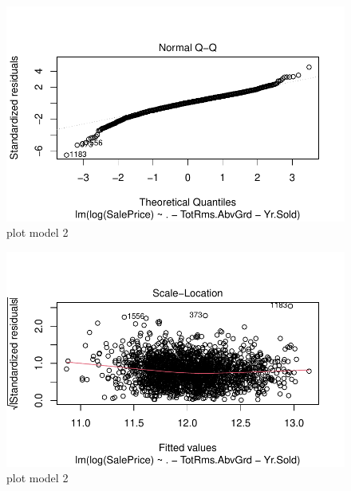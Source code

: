 \documentclass[
  letterpaper,
  DIV=11,
  numbers=noendperiod]{scrartcl}
\begin{document}
\begin{figure}[H]

{\centering \includegraphics{paper_files/figure-pdf/plotmodel2-2.pdf}

}

\caption{plot model 2}

\end{figure}%

\begin{figure}[H]

{\centering \includegraphics{paper_files/figure-pdf/plotmodel2-3.pdf}

}

\caption{plot model 2}

\end{figure}%
\end{document}
